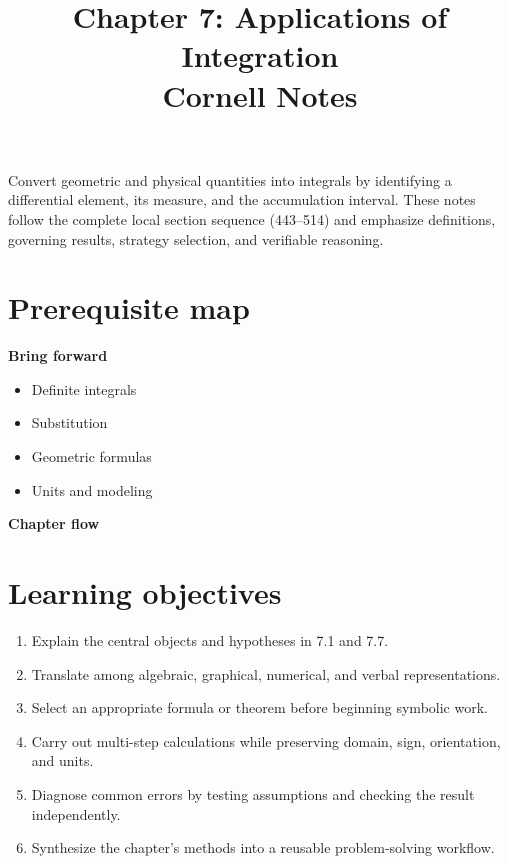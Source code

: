 \documentclass[11pt]{article}
\title{Chapter 7: Applications of Integration\\[2mm]\large Cornell Notes}
\author{}
\date{}
\begin{document}
\maketitle
\thispagestyle{fancy}
\begin{orientationbox}
Convert geometric and physical quantities into integrals by identifying a differential element, its measure, and the accumulation interval. These notes follow the complete local section sequence (443--514) and emphasize definitions, governing results, strategy selection, and verifiable reasoning.
\end{orientationbox}

\section{Prerequisite map}
\begin{minipage}[t]{0.42\textwidth}
\textbf{Bring forward}
\begin{itemize}
\item Definite integrals
\item Substitution
\item Geometric formulas
\item Units and modeling
\end{itemize}
\end{minipage}\hfill
\begin{minipage}[t]{0.54\textwidth}
\textbf{Chapter flow}
\begin{center}
\end{center}
\end{minipage}

\section{Learning objectives}
\begin{enumerate}
\item Explain the central objects and hypotheses in 7.1 and 7.7.
\item Translate among algebraic, graphical, numerical, and verbal representations.
\item Select an appropriate formula or theorem before beginning symbolic work.
\item Carry out multi-step calculations while preserving domain, sign, orientation, and units.
\item Diagnose common errors by testing assumptions and checking the result independently.
\item Synthesize the chapter's methods into a reusable problem-solving workflow.
\end{enumerate}
\end{document}
